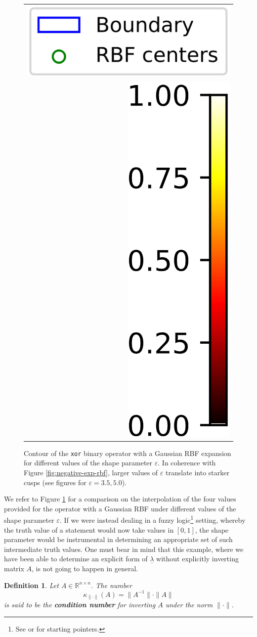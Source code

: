 \documentclass[12pt]{report} %
\newtheorem{definition}{Definition}
\newcommand{\tmstrong}[1]{\textbf{#1}}
\newcommand{\tmverbatim}[1]{\text{{\ttfamily{#1}}}}
\begin{document}
\begin{figure}[ht]
\begin{tabular}{ll}
\end{tabular}
\begin{tabular}{r}
{\includegraphics[width=.24\textwidth, trim={0 -2cm 0 0}, clip=true]{imagenes/xor/Legend.png}}
\\
 {\includegraphics[height=.4\textwidth]{imagenes/xor/Colorbar.png}} 
\end{tabular}
    \caption{Contour of the \texttt{xor} binary operator with a Gaussian RBF expansion for different values of the shape parameter $\varepsilon$. In coherence with Figure \ref{fig:negative-exp-rbf}, larger values of $\varepsilon$ translate into starker cusps (see figures for $\varepsilon=3.5,5.0$).}
    \label{fig:xor}
\end{figure}

We refer to Figure \ref{fig:xor} for a comparison on the interpolation of the
four values provided for the \tmverbatim{xor} operator with a Gaussian RBF
under different values of the shape parameter $\varepsilon$. If we were
instead dealing in a fuzzy logic\footnote{See {\cite{zadeh1988fuzzy}} or
{\cite{russell2005ai}} for starting pointers.} setting, whereby the truth
value of a statement would now take values in $[0, 1]$, the shape parameter
would be instrumental in determining an appropriate set of such intermediate
truth values. One must bear in mind that this example, where we have been able
to determine an explicit form of $\underline{\lambda}$ without explicitly
inverting matrix $A$, is not going to happen in general.

\begin{definition}
  Let $A \in \mathbb{R}^{n \times n}$. The number
  \[ \kappa_{\| \cdot \|} (A) = \| A^{- 1} \| \cdot \| A \| \]
  is said to be the {\tmstrong{condition number}} for inverting $A$ under the
  norm $\| \cdot \|$.
\end{definition}
\end{document}

